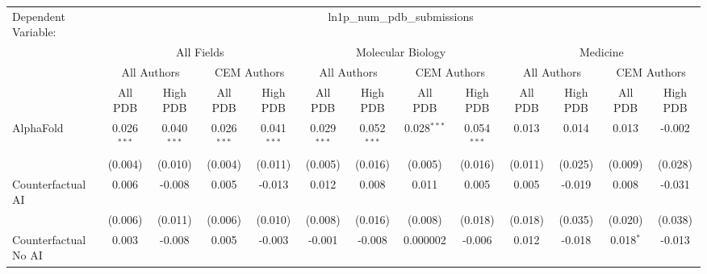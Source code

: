 \begingroup
\centering
\begin{tabular}{lcccccccccccc}
   \tabularnewline \midrule \midrule
   Dependent Variable: & \multicolumn{12}{c}{ln1p\_num\_pdb\_submissions}\\
 & \multicolumn{4}{c}{All Fields} & \multicolumn{4}{c}{Molecular Biology} & \multicolumn{4}{c}{Medicine} \\
\cmidrule(lr){2-5} \cmidrule(lr){6-9} \cmidrule(lr){10-13}
 & \multicolumn{2}{c}{All Authors} & \multicolumn{2}{c}{CEM Authors} & \multicolumn{2}{c}{All Authors} & \multicolumn{2}{c}{CEM Authors} & \multicolumn{2}{c}{All Authors} & \multicolumn{2}{c}{CEM Authors} \\
\cmidrule(lr){2-3} \cmidrule(lr){4-5} \cmidrule(lr){6-7} \cmidrule(lr){8-9} \cmidrule(lr){10-11} \cmidrule(lr){12-13}
 & \multicolumn{1}{c}{All PDB} & \multicolumn{1}{c}{High PDB} & \multicolumn{1}{c}{All PDB} & \multicolumn{1}{c}{High PDB} & \multicolumn{1}{c}{All PDB} & \multicolumn{1}{c}{High PDB} & \multicolumn{1}{c}{All PDB} & \multicolumn{1}{c}{High PDB} & \multicolumn{1}{c}{All PDB} & \multicolumn{1}{c}{High PDB} & \multicolumn{1}{c}{All PDB} & \multicolumn{1}{c}{High PDB} \\
\cmidrule(lr){2-2} \cmidrule(lr){3-3} \cmidrule(lr){4-4} \cmidrule(lr){5-5} \cmidrule(lr){6-6} \cmidrule(lr){7-7} \cmidrule(lr){8-8} \cmidrule(lr){9-9} \cmidrule(lr){10-10} \cmidrule(lr){11-11} \cmidrule(lr){12-12} \cmidrule(lr){13-13}
   AlphaFold                                                  & 0.026$^{***}$ & 0.040$^{***}$ & 0.026$^{***}$ & 0.041$^{***}$ & 0.029$^{***}$ & 0.052$^{***}$ & 0.028$^{***}$ & 0.054$^{***}$ & 0.013   & 0.014   & 0.013       & -0.002\\   
                                                              & (0.004)       & (0.010)       & (0.004)       & (0.011)       & (0.005)       & (0.016)       & (0.005)       & (0.016)       & (0.011) & (0.025) & (0.009)     & (0.028)\\   
   Counterfactual AI                                          & 0.006         & -0.008        & 0.005         & -0.013        & 0.012         & 0.008         & 0.011         & 0.005         & 0.005   & -0.019  & 0.008       & -0.031\\   
                                                              & (0.006)       & (0.011)       & (0.006)       & (0.010)       & (0.008)       & (0.016)       & (0.008)       & (0.018)       & (0.018) & (0.035) & (0.020)     & (0.038)\\   
   Counterfactual No AI                                       & 0.003         & -0.008        & 0.005         & -0.003        & -0.001        & -0.008        & 0.000002      & -0.006        & 0.012   & -0.018  & 0.018$^{*}$ & -0.013\\   

\end{tabular}
